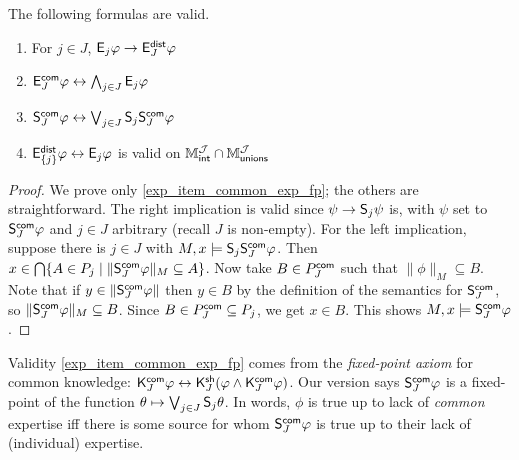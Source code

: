 \begin{proposition}
\label{exp_prop_collective_validities}
The following formulas are valid.

\begin{enumerate}
    \item For $j \in J$, $\mathsf{E}_j\varphi \to \mathsf{E}_J^{\mathsf{dist}}\varphi$

    \item $\mathsf{E}_J^{\mathsf{com}}\varphi \leftrightarrow \bigwedge_{j \in J}{\mathsf{E}_j\varphi}$

    \item\label{exp_item_common_exp_fp} $\mathsf{S}_J^{\mathsf{com}}\varphi \leftrightarrow \bigvee_{j \in
        J}\mathsf{S}_j\mathsf{S}_J^{\mathsf{com}}\varphi$

    \item $\mathsf{E}_{\{j\}}^{\mathsf{dist}}\varphi \leftrightarrow \mathsf{E}_j\varphi$ is valid on $\mathbb{M}_{\mathsf{int}}^{\mathcal{J}} \cap
          \mathbb{M}_{\mathsf{unions}}^{\mathcal{J}}$

    \end{enumerate}
\end{proposition}
\begin{proof}
    We prove only \cref{exp_item_common_exp_fp}; the others are straightforward.
    The right implication is valid since $\psi \to \mathsf{S}_j\psi$ is, with
    $\psi$ set to $\mathsf{S}_J^{\mathsf{com}}\varphi$ and $j \in J$ arbitrary (recall $J$ is
    non-empty).
    For the left implication, suppose there is $j \in J$ with $M, x \models
    \mathsf{S}_j\mathsf{S}_J^{\mathsf{com}}\varphi$. Then $x \in \bigcap\{A \in P_j \mid
    \|\mathsf{S}_J^{\mathsf{com}}\varphi\|_M \subseteq A\}$. Now take $B \in P_J^{\mathsf{com}}$ such
    that $\|\phi\|_M \subseteq B$. Note that if $y \in \|\mathsf{S}_J^{\mathsf{com}}\varphi\|$
    then $y \in B$ by the definition of the semantics for $\mathsf{S}_J^{\mathsf{com}}$, so
    $\|\mathsf{S}_J^{\mathsf{com}}\varphi\|_M \subseteq B$. Since $B \in P_J^{\mathsf{com}} \subseteq
    P_j$, we get $x \in B$.  This shows $M, x \models \mathsf{S}_J^{\mathsf{com}}\varphi$.
\end{proof}

Validity \cref{exp_item_common_exp_fp} comes from the
\emph{fixed-point axiom} for common knowledge: $\mathsf{K}^{\mathsf{com}}_J\varphi \leftrightarrow
\mathsf{K}^{\mathsf{sh}}_J(\varphi \land \mathsf{K}^{\mathsf{com}}_J\varphi)$. Our version says
$\mathsf{S}_J^{\mathsf{com}}\varphi$ is a fixed-point of the function $\theta \mapsto \bigvee_{j
\in J}{\mathsf{S}_j\theta}$. In words, $\phi$ is true up to lack of \emph{common}
expertise iff there is some source for whom $\mathsf{S}_J^{\mathsf{com}}\varphi$ is true up to
their lack of (individual) expertise.

